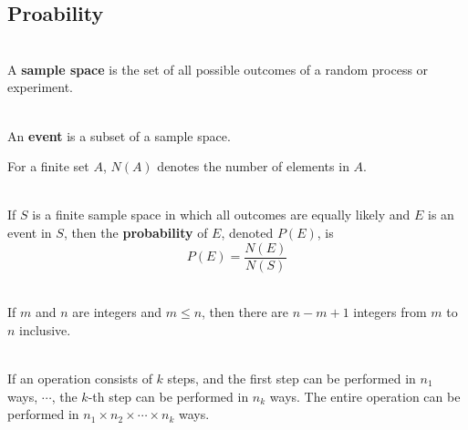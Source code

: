 \documentclass[12pt]{article}
\begin{document}
\subsection{Proability}
\begin{definition}
\hfill\\
\normalfont A \textbf{sample space} is the set of all possible outcomes of a random process or experiment.
\end{definition}
\begin{definition}[Event]
\hfill\\
\normalfont An \textbf{event} is a subset of a sample space.
\end{definition}
For a finite set $A$, $N(A)$ denotes the number of elements in $A$.
\begin{theorem}
\hfill\\
\normalfont If $S$ is a finite sample space in which all outcomes are equally likely and $E$ is an event in $S$, then the \textbf{probability} of $E$, denoted $P(E)$, is
\[
P(E)=\frac{N(E)}{N(S)}
\]
\end{theorem}
\begin{theorem}[9.1.1]
\hfill\\
\normalfont If $m$ and $n$ are integers and $m\leq n$, then there are $n-m+1$ integers from $m$ to $n$ inclusive.
\end{theorem}
\begin{theorem}
\hfill\\
\normalfont If an operation consists of $k$ steps, and the first step can be performed in $n_1$ ways, $\cdots$, the $k$-th step can be performed in $n_k$ ways. The entire operation can be performed in $n_1\times n_2\times\cdots\times n_k$ ways.
\end{theorem}
\end{document}
